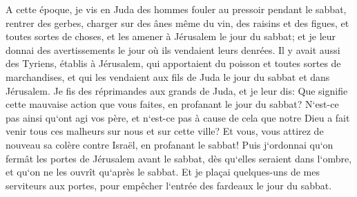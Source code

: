 \verse A cette époque, je vis en Juda des hommes fouler au pressoir pendant le sabbat, rentrer des gerbes, charger sur des ânes même du vin, des raisins et des figues, et toutes sortes de choses, et les amener à Jérusalem le jour du sabbat; et je leur donnai des avertissements le jour où ils vendaient leurs denrées. 
\verse Il y avait aussi des Tyriens, établis à Jérusalem, qui apportaient du poisson et toutes sortes de marchandises, et qui les vendaient aux fils de Juda le jour du sabbat et dans Jérusalem. 
\verse Je fis des réprimandes aux grands de Juda, et je leur dis: Que signifie cette mauvaise action que vous faites, en profanant le jour du sabbat? 
\verse N`est-ce pas ainsi qu`ont agi vos père, et n`est-ce pas à cause de cela que notre Dieu a fait venir tous ces malheurs sur nous et sur cette ville? Et vous, vous attirez de nouveau sa colère contre Israël, en profanant le sabbat! 
\verse Puis j`ordonnai qu`on fermât les portes de Jérusalem avant le sabbat, dès qu`elles seraient dans l`ombre, et qu`on ne les ouvrît qu`après le sabbat. Et je plaçai quelques-uns de mes serviteurs aux portes, pour empêcher l`entrée des fardeaux le jour du sabbat. 
